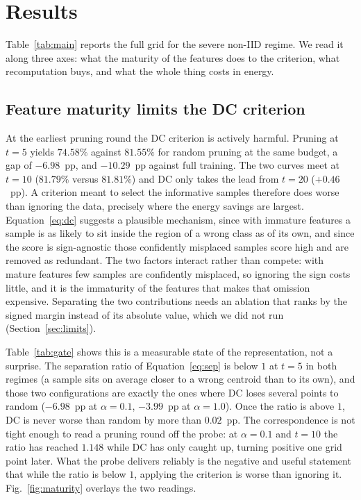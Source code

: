 \documentclass[conference]{IEEEtran}
\begin{document}
\section{Results}

Table~\ref{tab:main} reports the full grid for the severe non-IID regime. We read it
along three axes: what the maturity of the features does to the criterion, what
recomputation buys, and what the whole thing costs in energy.

\subsection{Feature maturity limits the DC criterion}\label{sec:res-maturity}

At the earliest pruning round the DC criterion is actively harmful. Pruning at
$t=5$ yields $74.58\%$ against $81.55\%$ for random pruning at the same budget, a gap
of $-6.98$~pp, and $-10.29$~pp against full training. The two curves meet at $t=10$
($81.79\%$ versus $81.81\%$) and DC only takes the lead from $t=20$ ($+0.46$~pp).
A criterion meant to select the informative samples therefore does worse than ignoring
the data, precisely where the energy savings are largest. Equation~\eqref{eq:dc}
suggests a plausible mechanism, since with immature features a sample is as likely to
sit inside the region of a wrong class as of its own, and since the score is
sign-agnostic those confidently misplaced samples score high and are removed as
redundant. The two factors interact rather than compete: with mature features few
samples are confidently misplaced, so ignoring the sign costs little, and it is the
immaturity of the features that makes that omission expensive. Separating the two
contributions needs an ablation that ranks by the signed margin instead of its
absolute value, which we did not run (Section~\ref{sec:limits}).

Table~\ref{tab:gate} shows this is a measurable state of the representation, not a
surprise. The separation ratio of Equation~\eqref{eq:sep} is below $1$ at $t=5$ in
both regimes (a sample sits on average closer to a wrong centroid than to its own),
and those two configurations are exactly the ones where DC loses several points to
random ($-6.98$~pp at $\alpha=0.1$, $-3.99$~pp at $\alpha=1.0$). Once the ratio is
above $1$, DC is never worse than random by more than $0.02$~pp. The correspondence is
not tight enough to read a pruning round off the probe: at $\alpha=0.1$ and $t=10$ the
ratio has reached $1.148$ while DC has only caught up, turning positive one grid point
later. What the probe delivers reliably is the negative and useful statement that while
the ratio is below $1$, applying the criterion is worse than ignoring it.
Fig.~\ref{fig:maturity} overlays the two readings.
\end{document}
